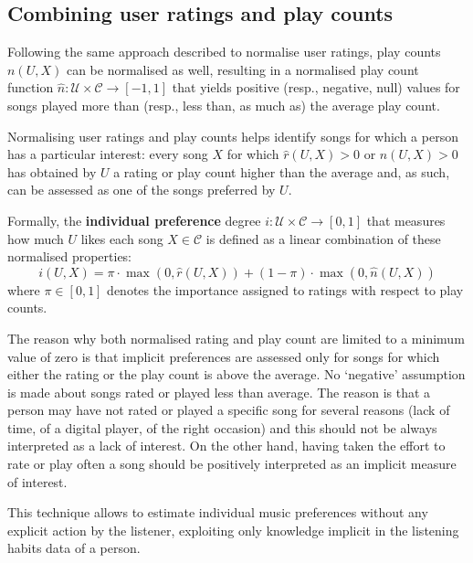 
\subsection{Combining user ratings and play counts} %
\label{sub:positive_and_negative_implicit_preferences}

Following the same approach described to normalise user ratings, play counts $n(U,X)$ can be normalised as well, resulting in a normalised play count function $\widehat{n}: \mathcal{U} \times \mathcal{C} \to [-1,1]$ that yields positive (resp., negative, null) values for songs played more than (resp., less than, as much as) the average play count.

Normalising user ratings and play counts helps identify songs for which a person has a particular interest: 
every song $X$ for which $\widehat{r}(U,X) > 0$ or $\widehat{n}(U,X) > 0$ has obtained by $U$ a rating or play count higher than the average and, as such, can be assessed as one of the songs preferred by $U$.

Formally, the \textbf{individual preference} degree $i: \mathcal{U} \times \mathcal{C} \to [0,1]$ that measures how much $U$ likes each song $X \in \mathcal{C}$ is defined as a linear combination of these normalised properties:
\begin{equation}\label{eq:implicit_preference}
i(U,X) = \pi \cdot \max(0,\widehat{r}(U,X)) + (1 - \pi) \cdot \max(0,\widehat{n}(U,X)) %
\end{equation}
where $\pi \in [0,1]$ denotes the importance assigned to ratings with respect to play counts.

The reason why both normalised rating and play count are limited to a minimum value of zero is that implicit preferences are assessed only for songs for which either the rating or the play count is above the average.
No `negative' assumption is made about songs rated or played less than average.
The reason is that a person may have not rated or played a specific song for several reasons (lack of time, of a digital player, of the right occasion) and this should not be always interpreted as a lack of interest.
On the other hand, having taken the effort to rate or play often a song should be positively interpreted as an implicit measure of interest.

This technique allows to estimate individual music preferences without any explicit action by the listener, exploiting only knowledge implicit in the listening habits data of a person.

